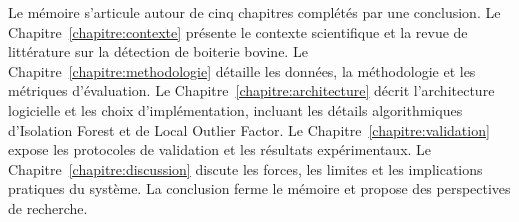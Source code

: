 \begin{introduction}
Le mémoire s'articule autour de cinq chapitres complétés par une conclusion.
Le Chapitre~\ref{chapitre:contexte} présente le contexte scientifique et la revue de
littérature sur la détection de boiterie bovine. Le Chapitre~\ref{chapitre:methodologie}
détaille les données, la méthodologie et les métriques d'évaluation. Le
Chapitre~\ref{chapitre:architecture} décrit l'architecture logicielle et les choix
d'implémentation, incluant les détails algorithmiques d'Isolation Forest et de
Local Outlier Factor. Le Chapitre~\ref{chapitre:validation} expose les
protocoles de validation et les résultats expérimentaux. Le
Chapitre~\ref{chapitre:discussion} discute les forces, les limites et les implications
pratiques du système. La conclusion ferme le mémoire et propose des perspectives de
recherche.

\end{introduction}
